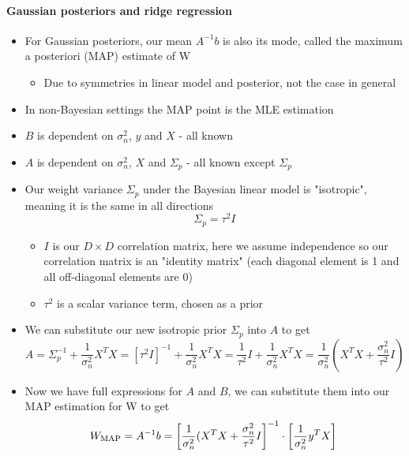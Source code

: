 \documentclass[12pt]{article}
\begin{document}
\paragraph{Gaussian posteriors and ridge regression}
\begin{itemize}
    \item For Gaussian posteriors, our mean $A^{-1}b$ is also its mode, called the maximum a posteriori (MAP) estimate of W
        \begin{itemize}
            \item Due to symmetries in linear model and posterior, not the case in general
        \end{itemize}
    \item In non-Bayesian settings the MAP point is the MLE estimation
    \item $B$ is dependent on $\sigma_n^2$, $y$ and $X$ - all known
    \item $A$ is dependent on $\sigma_n^2$, $X$ and $\Sigma_p$ - all known except $\Sigma_p$
    \item Our weight variance $\Sigma_p$ under the Bayesian linear model is "isotropic", meaning it is the same in all directions
\begin{equation}
    \Sigma_p = \tau^2 I
\end{equation}
    \begin{itemize}
        \item $I$ is our $D \times D$ correlation matrix, here we assume independence so our correlation matrix is an "identity matrix" (each diagonal element is 1 and all off-diagonal elements are 0)
        \item $\tau^2$ is a scalar variance term, chosen as a prior
    \end{itemize}
    \item We can substitute our new isotropic prior $\Sigma_p$ into $A$ to get
\begin{equation} 
    A = \Sigma_p^{-1} + \frac{1}{\sigma^2_n}X^TX = \left[{\tau^2}I\right]^{-1} + \frac{1}{\sigma^2_n}X^TX =  \frac{1}{\tau^2}I + \frac{1}{\sigma^2_n}X^TX = \frac{1}{\sigma_n^2}\left(X^TX + \frac{\sigma_n^2}{\tau^2}I\right)
\end{equation} 
    \item Now we have full expressions for $A$ and $B$, we can substitute them into our MAP estimation for W to get
\begin{equation} 
    W_{\text{MAP}} = A^{-1}b = \left[\frac{1}{\sigma_n^2}(X^TX + \frac{\sigma_n^2}{\tau^2}I\right]^{-1} \cdot \left[\frac{1}{\sigma_n^2}y^TX\right] \\

\end{equation}
\end{itemize}
\end{document}
